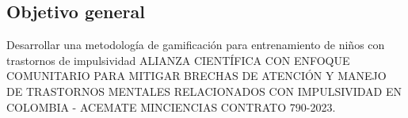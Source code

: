 \documentclass[10pt, spanish]{article}
\begin{document}
\subsection{Objetivo general}
Desarrollar una metodología de gamificación para entrenamiento de niños con trastornos de impulsividad ALIANZA CIENTÍFICA CON ENFOQUE COMUNITARIO PARA MITIGAR BRECHAS DE ATENCIÓN Y MANEJO DE TRASTORNOS MENTALES RELACIONADOS CON IMPULSIVIDAD EN COLOMBIA - ACEMATE MINCIENCIAS CONTRATO 790-2023.







\end{document}
